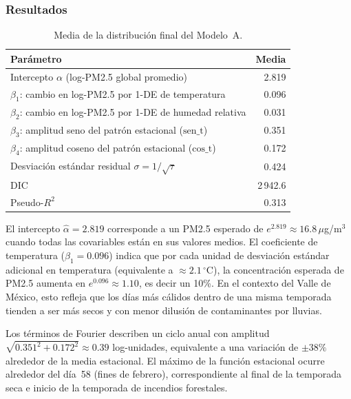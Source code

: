 ﻿\documentclass[12pt]{article}
\begin{document}
\subsubsection*{Resultados}

\begin{table}[H]
\centering
\caption{Media de la distribuci\'on final del Modelo~A.}
\label{tab:modA}
\begin{tabular}{>{\raggedright\arraybackslash}p{8.5cm}r}
\toprule
Par\'ametro & Media \\
\midrule
Intercepto $\alpha$ (log-PM2.5 global promedio)               &  2.819 \\
$\beta_1$: cambio en log-PM2.5 por 1-DE de temperatura       &  0.096 \\
$\beta_2$: cambio en log-PM2.5 por 1-DE de humedad relativa  &  0.031 \\
$\beta_3$: amplitud seno del patr\'on estacional ($\text{sen\_t}$) & 0.351 \\
$\beta_4$: amplitud coseno del patr\'on estacional ($\text{cos\_t}$) & 0.172 \\
Desviaci\'on est\'andar residual $\sigma = 1/\sqrt{\tau}$     &  0.424 \\
\midrule
DIC                                                            & 2\,942.6 \\
Pseudo-$R^2$                                                   & 0.313 \\
\bottomrule
\end{tabular}
\end{table}

El intercepto $\hat\alpha = 2.819$ corresponde a un PM2.5 esperado de
$e^{2.819} \approx 16.8\,\mu$g/m$^3$ cuando todas las covariables est\'an
en sus valores medios.
El coeficiente de temperatura ($\hat\beta_1 = 0.096$) indica que por cada
unidad de desviaci\'on est\'andar adicional en temperatura
(equivalente a $\approx 2.1\,^\circ$C), la concentraci\'on esperada de
PM2.5 aumenta en $e^{0.096} \approx 1.10$, es decir un 10\%.
En el contexto del Valle de M\'exico, esto refleja que los d\'ias m\'as
c\'alidos dentro de una misma temporada tienden a ser m\'as secos y con
menor dilusi\'on de contaminantes por lluvias.

Los t\'erminos de Fourier describen un ciclo anual con amplitud
$\sqrt{0.351^2 + 0.172^2} \approx 0.39$ log-unidades, equivalente
a una variaci\'on de $\pm 38\%$ alrededor de la media estacional.
El m\'aximo de la funci\'on estacional ocurre alrededor del d\'ia~58
(fines de febrero), correspondiente al final de la temporada seca e
inicio de la temporada de incendios forestales.
\end{document}
